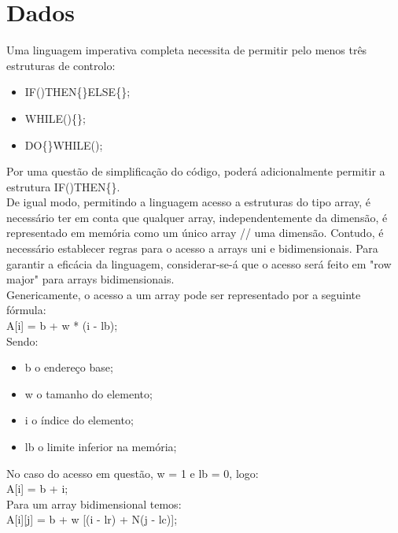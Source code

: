 \section{Dados}
\label{sec:dados:analise}

Uma linguagem imperativa completa necessita de permitir pelo menos três estruturas de controlo:

\begin{itemize}
\item IF()THEN\{\}ELSE\{\};
\item WHILE()\{\};
\item DO\{\}WHILE();
\end{itemize}

Por uma questão de simplificação do código, poderá adicionalmente permitir a estrutura IF()THEN\{\}.\\

De igual modo, permitindo a linguagem acesso a estruturas do tipo array, é necessário ter em conta que qualquer array, independentemente da dimensão, é representado em memória como um único array // uma dimensão. Contudo, é necessário establecer regras para o acesso a arrays uni e bidimensionais. Para garantir a eficácia da linguagem, considerar-se-á que o acesso será feito em "row major" para arrays bidimensionais.\\

Genericamente, o acesso a um array pode ser representado por a seguinte fórmula:\\

A[i] = b + w * (i - lb);\\

Sendo:

\begin{itemize}
\item b o endereço base;
\item w o tamanho do elemento;
\item i o índice do elemento;
\item lb o limite inferior na memória;
\end{itemize}

No caso do acesso em questão, w = 1 e lb = 0, logo:\\

A[i] = b + i;\\


Para um array bidimensional temos:\\

A[i][j] = b + w [(i - lr) + N(j - lc)];\\

